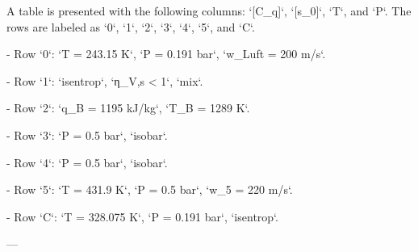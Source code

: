 A table is presented with the following columns: `[C_q]`, `[s_0]`, `T`, and `P`. The rows are labeled as `0`, `1`, `2`, `3`, `4`, `5`, and `C`.  

- Row `0`:  
  `T = 243.15 K`, `P = 0.191 bar`, `w_Luft = 200 m/s`.  

- Row `1`:  
  `isentrop`, `η_V,s < 1`, `mix`.  

- Row `2`:  
  `q_B = 1195 kJ/kg`, `T_B = 1289 K`.  

- Row `3`:  
  `P = 0.5 bar`, `isobar`.  

- Row `4`:  
  `P = 0.5 bar`, `isobar`.  

- Row `5`:  
  `T = 431.9 K`, `P = 0.5 bar`, `w_5 = 220 m/s`.  

- Row `C`:  
  `T = 328.075 K`, `P = 0.191 bar`, `isentrop`.  

---